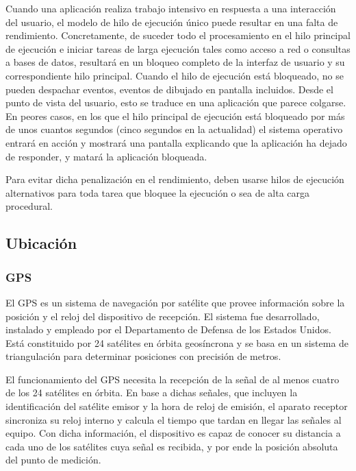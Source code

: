     Cuando una aplicación realiza trabajo intensivo en respuesta a una interacción del usuario, el modelo de hilo de ejecución único puede resultar en una falta de rendimiento. Concretamente, de suceder todo el procesamiento en el hilo principal de ejecución e iniciar tareas de larga ejecución tales como acceso a red o consultas a bases de datos, resultará en un bloqueo completo de la interfaz de usuario y su correspondiente hilo principal. Cuando el hilo de ejecución está bloqueado, no se pueden despachar eventos, eventos de dibujado en pantalla incluidos. Desde el punto de vista del usuario, esto se traduce en una aplicación que parece colgarse. En peores casos, en los que el hilo principal de ejecución está bloqueado por más de unos cuantos segundos (cinco segundos en la actualidad) el sistema operativo entrará en acción y mostrará una pantalla explicando que la aplicación ha dejado de responder, y matará la aplicación bloqueada. 

    Para evitar dicha penalización en el rendimiento, deben usarse hilos de ejecución alternativos para toda tarea que bloquee la ejecución o sea de alta carga procedural.

\FloatBarrier

\subsection{Ubicación}
\subsubsection{GPS}
El \ac{GPS} es un sistema de navegación por satélite que provee información sobre la posición y el reloj del dispositivo de recepción. El sistema fue desarrollado, instalado y empleado por el Departamento de Defensa de los Estados Unidos. Está constituido por 24 satélites en órbita geosíncrona y se basa en un sistema de triangulación para determinar posiciones con precisión de metros.

El funcionamiento del \ac{GPS} necesita la recepción de la señal de al menos cuatro de los 24 satélites en órbita. En base a dichas señales, que incluyen la identificación del satélite emisor y la hora de reloj de emisión, el aparato receptor sincroniza su reloj interno y calcula el tiempo que tardan en llegar las señales al equipo. Con dicha información, el dispositivo es capaz de conocer su distancia a cada uno de los satélites cuya señal es recibida, y por ende la posición absoluta del punto de medición.

